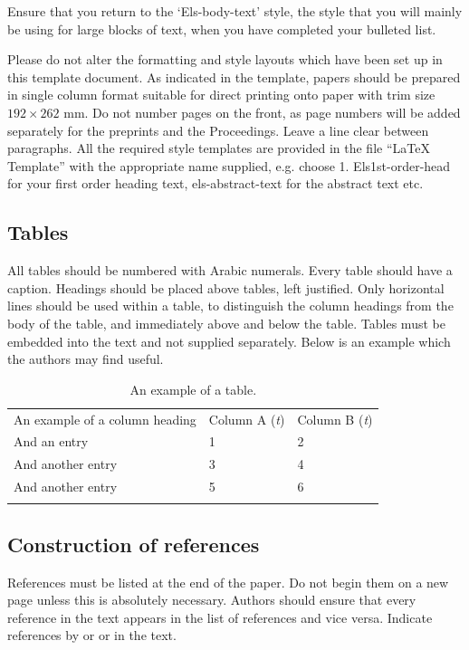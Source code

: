 \documentclass[5p,times,procedia]{elsarticle}
\begin{document}
Ensure that you return to the `Els-body-text' style, the style that you will mainly be using for large blocks of text, when you have completed your bulleted list. 

Please do not alter the formatting and style layouts which have been set up in this template document. As indicated in the template, papers should be prepared in single column format suitable for direct printing onto paper with trim size $192 \times 262$ mm. Do not number pages on the front, as page numbers will be added separately for the preprints and the Proceedings. Leave a line clear between paragraphs. All the required style templates are provided in the file ``LaTeX Template'' with the appropriate name supplied, e.g. choose 1. Els1st-order-head for your first order heading text, els-abstract-text for the abstract text etc.

\subsection{ Tables}

All tables should be numbered with Arabic numerals. Every table should have a caption. Headings should be placed above tables, left justified. Only horizontal lines should be used within a table, to distinguish the column headings from the body of the table, and immediately above and below the table. Tables must be embedded into the text and not supplied separately. Below is an example which the authors may find useful.

\begin{table}[h]
\caption{An example of a table.}
\begin{tabular*}{\hsize}{@{\extracolsep{\fill}}lll@{}}
\toprule
An example of a column heading & Column A ({\it{t}}) & Column B ({\it{t}})\\
\colrule
And an entry &   1 &  2\\
And another entry  & 3 &  4\\
And another entry &  5 &  6\\
\botrule
\end{tabular*}
\end{table}


\subsection{ Construction of references}

References must be listed at the end of the paper. Do not begin them on a new page unless this is absolutely necessary. Authors should ensure that every reference in the text appears in the list of references and vice versa. Indicate references by \cite{clark} or \cite{Deal} or \cite{Fachinger2006} in the text. 
\end{document}
